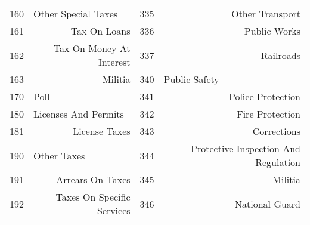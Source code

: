\begin{tabular}{@{}rr|r|r|@{}}
\multicolumn{1}{|l|}{160}           & \multicolumn{1}{l|}{Other Special Taxes}                           & 335                                & Other Transport                                                                    \\
\multicolumn{1}{|r|}{161}           & Tax On Loans                                                       & 336                                & Public Works                                                                       \\
\multicolumn{1}{|r|}{162}           & Tax On Money At Interest                                           & 337                                & Railroads                                                                          \\
\multicolumn{1}{|r|}{163}           & Militia                                                            & \multicolumn{1}{l|}{340}           & \multicolumn{1}{l|}{Public Safety}                                                 \\
\multicolumn{1}{|l|}{170}           & \multicolumn{1}{l|}{Poll}                                          & 341                                & Police Protection                                                                  \\
\multicolumn{1}{|l|}{180}           & \multicolumn{1}{l|}{Licenses And Permits}                          & 342                                & Fire Protection                                                                    \\
\multicolumn{1}{|r|}{181}           & License Taxes                                                      & 343                                & Corrections                                                                        \\
\multicolumn{1}{|l|}{190}           & \multicolumn{1}{l|}{Other Taxes}                                   & 344                                & Protective Inspection And Regulation                                               \\
\multicolumn{1}{|r|}{191}           & Arrears On Taxes                                                   & 345                                & Militia                                                                            \\
\multicolumn{1}{|r|}{192}           & Taxes On Specific Services                                         & 346                                & National Guard                                                                     \\

\end{tabular}
